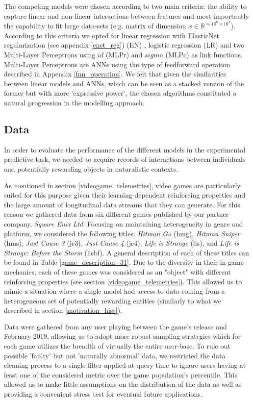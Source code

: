 The competing models were chosen according to two main criteria: the ability to capture linear and non-linear interactions between features and most importantly the capability to fit large data-sets (e.g. matrix of dimension $x \in \mathbb{R}^{\approx10^6\times10^2}$). According to this criteria we opted for linear regression with ElasticNet regularization (see appendix \ref{enet_reg}) (EN) \cite{zou2005regularization}, logistic regression (LR) and two Multi-Layer Perceptrons using  $id$ (MLPr) and $sigma$ (MLPc) as link functions. Multi-Layer Perceptrons are ANNs using the type of feedforward operation described in Appendix \ref{fnn_operation}. We felt that given the similarities between linear models and ANNs, which can be seen as a stacked version of the former but with more 'expressive power', the chosen algorithms constituted a natural progression in the modelling approach. 

\subsection{Data}
\label{data_1}
In order to evaluate the performance of the different models in the experimental predictive task, we needed to acquire records of interactions between individuals and potentially rewarding objects in naturalistic contexts. 

As mentioned in section \ref{videogame_telemetries}, video games are particularly suited for this purpose given their learning-dependent reinforcing properties and the large amount of longitudinal data streams that they can generate. For this reason we gathered data from six different games published by our partner company, \textit{Square Enix Ltd}. Focusing on maintaining heterogeneity in genre and platform, we considered the following titles: \emph{Hitman Go} (hmg), \emph{Hitman Sniper} (hms), \emph{Just Cause 3} (jc3), \emph{Just Cause 4} (jc4), \emph{Life is Strange} (lis), and \emph{Life is Strange: Before the Storm} (lisbf). A general description of each of these titles can be found in Table \ref{game_description_31}. Due to the diversity in their in-game mechanics, each of these games was considered as an "object" with different reinforcing properties (see section \ref{videogame_telemetries}). This allowed us to mimic a situation where a single model had access to data coming from a heterogeneous set of potentially rewarding entities (similarly to what we described in section \ref{motivation_hist}). 

Data were gathered from any user playing between the game's release and February 2019, allowing us to adopt more robust sampling strategies which for each game utilizes the breadth of virtually the entire user-base. To rule out possible 'faulty' but not 'naturally abnormal' data, we restricted the data cleaning process to a single filter applied at query time to ignore users having at least one of the considered metric over the game population's  percentile. This allowed us to make little assumptions on the distribution of the data as well as providing a convenient stress test for eventual future applications.

